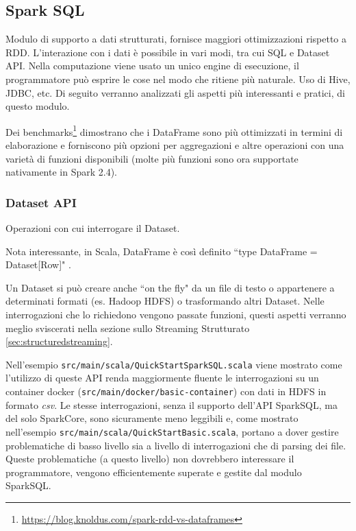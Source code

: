 \documentclass[12pt,italian]{article}
\begin{document}
\subsection{Spark SQL}\label{sec:SparkSQL}
Modulo di supporto a dati strutturati, fornisce maggiori ottimizzazioni rispetto a RDD. L'interazione con i dati è possibile in vari modi, tra cui SQL e Dataset API.
Nella computazione viene usato un unico engine di esecuzione, il programmatore può esprire le cose nel modo che ritiene più naturale. Uso di Hive, JDBC, etc. 
\newline
Di seguito verranno analizzati gli aspetti più interessanti e pratici, di questo modulo.
\par Dei benchmarks\footnote{\url{https://blog.knoldus.com/spark-rdd-vs-dataframes}} dimostrano che i DataFrame sono più ottimizzati in termini di elaborazione e forniscono più opzioni per aggregazioni e altre operazioni con una varietà di funzioni disponibili (molte più funzioni sono ora supportate nativamente in Spark 2.4).
\subsubsection{Dataset API}
Operazioni con cui interrogare il Dataset. 
\par Nota interessante, in Scala, DataFrame è così definito ``type DataFrame = Dataset[Row]" \cite{spark}.
\par Un Dataset si può creare anche ``on the fly" da un file di testo o appartenere a determinati formati (es. Hadoop HDFS) o trasformando altri Dataset.
Nelle interrogazioni che lo richiedono vengono passate funzioni, questi aspetti verranno meglio sviscerati nella sezione sullo Streaming Strutturato \ref{sec:structuredstreaming}.
\par Nell'esempio \texttt{src/main/scala/QuickStartSparkSQL.scala} viene mostrato come l'utilizzo di queste API renda maggiormente fluente le interrogazioni su un container docker (\texttt{src/main/docker/basic-container}) con dati in HDFS in formato \textit{csv}.
\newline 
Le stesse interrogazioni, senza il supporto dell'API SparkSQL, ma del solo SparkCore, sono sicuramente meno leggibili e, come mostrato nell'esempio \texttt{src/main/scala/QuickStartBasic.scala}, portano a dover gestire problematiche di basso livello sia a livello di interrogazioni che di parsing dei file. Queste problematiche (a questo livello) non dovrebbero interessare il programmatore, vengono efficientemente superate e gestite dal modulo SparkSQL.
\end{document}
